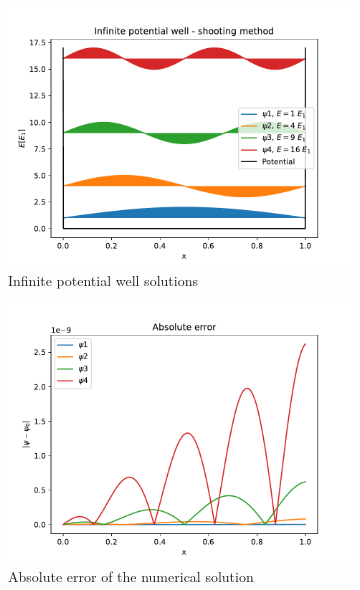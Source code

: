 \documentclass[12pt, a4paper]{article}
\begin{document}
\begin{figure}[hbtp]
  \begin{subfigure}{0.5\textwidth}
  \includegraphics[width=\linewidth]{shoot_infinite.pdf}
  \caption{Infinite potential well solutions} \label{fig:a}
  \end{subfigure}
  \hspace*{\fill}
  \begin{subfigure}{0.5\textwidth}
  \includegraphics[width=\linewidth]{error_shoot_infinite.pdf}
  \caption{Absolute error of the numerical solution} \label{fig:b}
  \end{subfigure}
  \medskip
  \begin{subfigure}{0.5\textwidth}

\end{subfigure}
\end{figure}
\end{document}

